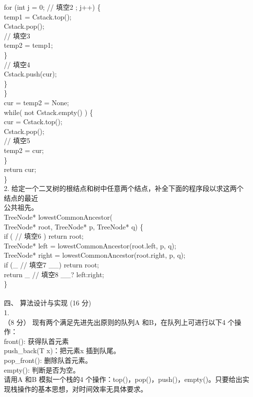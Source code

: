 \begin{question}
for (int j = 0;       // 填空2      ; j++) \{\\
temp1 = Cstack.top();\\
Cstack.pop();\\
// 填空3\\
temp2 = temp1;\\
\}\\
// 填空4\\
Cstack.push(cur);\\
\}\\
\}\\
cur = temp2 = None;\\
while( not Cstack.empty() ) \{\\
cur = Cstack.top();\\
Cstack.pop();\\
// 填空5\\
temp2 = cur;\\
\}\\
return cur;\\
\}\\
2. 给定一个二叉树的根结点和树中任意两个结点，补全下面的程序段以求这两个结点的最近\\
公共祖先。\\
TreeNode* lowestCommonAncestor(\\
TreeNode* root, TreeNode* p, TreeNode* q) \{\\
if (      // 填空6      ) return root;\\
TreeNode* left = lowestCommonAncestor(root.left, p, q);\\
TreeNode* right = lowestCommonAncestor(root.right, p, q);\\
if (\_      // 填空7      \_\_) return root;\\
return \_      // 填空8      \_\_? left:right;\\
\}\\
\\
四、 算法设计与实现 (16 分)\\
1.\\
（8 分） 现有两个满足先进先出原则的队列A 和B，在队列上可进行以下4 个操作：\\
front(): 获得队首元素\\
push\_back(T x)：把元素x 插到队尾。\\
pop\_front(): 删除队首元素。\\
empty(): 判断是否为空。\\
请用A 和B 模拟一个栈的4 个操作：top()，pop()，push()，empty()。只要给出实\\
现栈操作的基本思想，对时间效率无具体要求。\\

\end{question}
